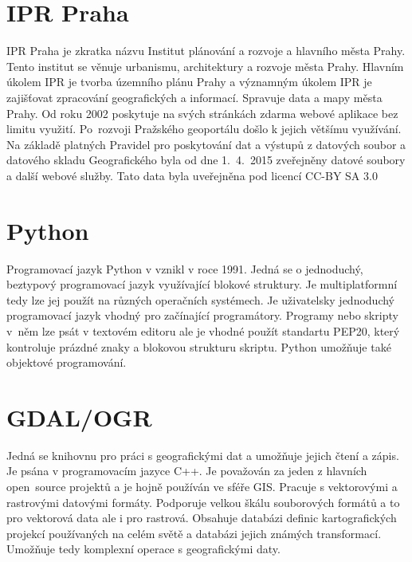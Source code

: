 \section{IPR Praha}
\label{4-IPR Praha}
IPR Praha je zkratka názvu Institut plánování a rozvoje a hlavního města Prahy. 
Tento institut se věnuje urbanismu, architektury a rozvoje města Prahy. Hlavním
úkolem IPR je tvorba územního plánu Prahy a významným úkolem IPR je zajišťovat
zpracování geografických a informací. Spravuje data a mapy města Prahy. Od roku 
2002 poskytuje na svých stránkách zdarma webové aplikace bez limitu využití. 
Po~rozvoji Pražského geoportálu došlo k jejich většímu využívání.  Na základě 
platných Pravidel pro poskytování dat a  výstupů z datových soubor a datového 
skladu Geografického byla od dne 1.~4.~2015 zveřejněny datové soubory a další 
webové služby. Tato data byla uveřejněna pod licencí CC-BY SA 3.0 \cite{IPR}


\section{Python}
\label{5-Python}
Programovací jazyk Python v vznikl v roce 1991. Jedná se o jednoduchý, beztypový 
 programovací jazyk využívající blokové struktury. Je multiplatformní tedy lze 
 jej použít na různých operačních systémech. Je uživatelsky jednoduchý 
 programovací jazyk vhodný pro začínající programátory. Programy nebo skripty 
 v~něm lze psát v textovém editoru ale je vhodné použít standartu PEP20, který
 kontroluje prázdné znaky a blokovou strukturu skriptu. Python umožňuje také 
 objektové programování. \cite{python}


\section{GDAL/OGR}
\label{6-GDAL/OGR}
Jedná se knihovnu pro práci s geografickými dat a umožňuje jejich čtení a zápis.
 Je psána v programovacím jazyce C++. Je považován za jeden z hlavních 
 open~source projektů a je hojně používán ve sféře GIS. Pracuje s vektorovými a 
 rastrovými datovými formáty. Podporuje velkou škálu souborových formátů a to 
 pro vektorová data ale i pro rastrová. Obsahuje databázi definic kartografických
 projekcí používaných na celém světě a databázi jejich známých transformací. 
 Umožňuje tedy komplexní operace s geografickými daty. \cite{GDAL}


